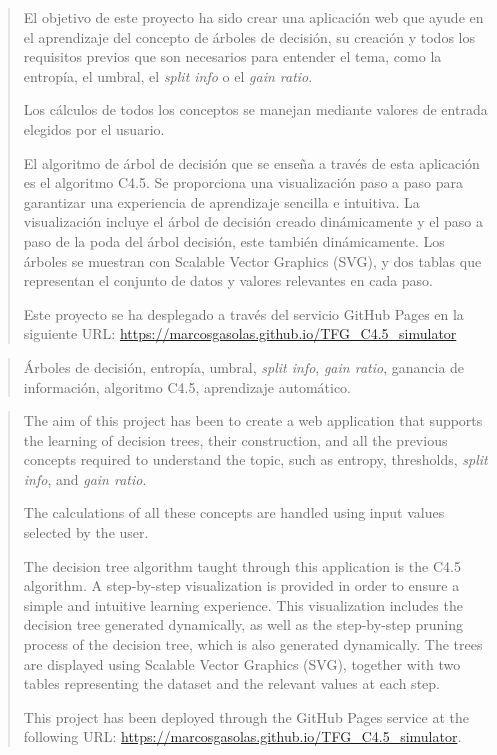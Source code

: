 \documentclass[a4paper,12pt,twoside]{memoir}
\begin{document}
\renewcommand*\abstractname{Resumen}
\begin{abstract}

El objetivo de este proyecto ha sido crear una aplicación web que ayude en el aprendizaje del concepto de árboles de decisión, su creación y todos los requisitos previos que son necesarios para entender el tema, como la entropía, el umbral, el \textit{split info} o el \textit{gain ratio}.

Los cálculos de todos los conceptos se manejan mediante valores de entrada elegidos por el usuario.

El algoritmo de árbol de decisión que se enseña a través de esta aplicación es el algoritmo C4.5. Se proporciona una visualización paso a paso para garantizar una experiencia de aprendizaje sencilla e intuitiva. La visualización incluye el árbol de decisión creado dinámicamente y el paso a paso de la poda del árbol decisión, este también dinámicamente. Los árboles se muestran con Scalable Vector Graphics (SVG), y dos tablas que representan el conjunto de datos y valores relevantes en cada paso.

Este proyecto se ha desplegado a través del servicio GitHub Pages en la siguiente URL: \url{https://marcosgasolas.github.io/TFG_C4.5_simulator}


\end{abstract}

\renewcommand*\abstractname{Descriptores}
\begin{abstract}

Árboles de decisión, entropía, umbral, \textit{split info}, \textit{gain ratio}, ganancia de información, algoritmo C4.5, aprendizaje automático.

\end{abstract}

\clearpage

\renewcommand*\abstractname{Abstract}
\begin{abstract}

The aim of this project has been to create a web application that supports the learning of decision trees, their construction, and all the previous concepts required to understand the topic, such as entropy, thresholds, \textit{split info}, and \textit{gain ratio}.

The calculations of all these concepts are handled using input values selected by the user.

The decision tree algorithm taught through this application is the C4.5 algorithm. A step-by-step visualization is provided in order to ensure a simple and intuitive learning experience. This visualization includes the decision tree generated dynamically, as well as the step-by-step pruning process of the decision tree, which is also generated dynamically. The trees are displayed using Scalable Vector Graphics (SVG), together with two tables representing the dataset and the relevant values at each step.

This project has been deployed through the GitHub Pages service at the following URL: \url{https://marcosgasolas.github.io/TFG_C4.5_simulator}.


\end{abstract}
\end{document}
